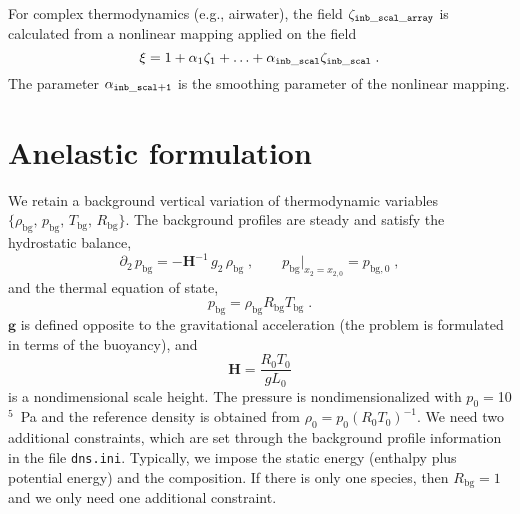 For complex thermodynamics (e.g., airwater), the field $\zeta_\mathrm{\tt inb\_scal\_array}$ is calculated from a nonlinear mapping applied on the field
\begin{equation}
  \xi =1+\alpha_1\zeta_1+\ldots+\alpha_\mathrm{\tt inb\_scal}\zeta_\mathrm{\tt inb\_scal}\;.
\end{equation}
The parameter $\alpha_\mathrm{\tt inb\_scal+1}$ is the smoothing parameter of the nonlinear mapping.

\section{Anelastic formulation}

We retain a background vertical variation of thermodynamic variables $\{\rho_\mathrm{bg},\, p_\mathrm{bg},\, T_\mathrm{bg},\, R_\mathrm{bg}\}$. The background profiles are steady and satisfy the hydrostatic balance,
\begin{equation}
  \partial_2\,p_\mathrm{bg}=-\mathbf{H}^{-1}\, g_2\,\rho_\mathrm{bg}\;,\qquad p_\mathrm{bg}|_{x_2=x_{2,0}}=p_{\mathrm{bg},0}\;,
\end{equation}
and the thermal equation of state,
\begin{equation}
  p_\mathrm{bg}  = \rho_\mathrm{bg} R_\mathrm{bg} T_\mathrm{bg} \;.
\end{equation}
$\mathbf{g}$ is defined opposite to the gravitational acceleration (the problem is formulated in terms of the buoyancy), and
\begin{equation}
  \mathbf{H} = \frac{R_0T_0}{gL_0}
\end{equation}
is a nondimensional scale height. The pressure is nondimensionalized with $p_0=$10$^5$~Pa and the reference density is obtained from $\rho_0=p_0(R_0T_0)^{-1}$. We need two additional constraints, which are set through the background profile information in the file {\tt dns.ini}. Typically, we impose the static energy (enthalpy plus potential energy) and the composition.
%
If there is only one species, then $R_\mathrm{bg}=1$ and we only need one additional constraint.

